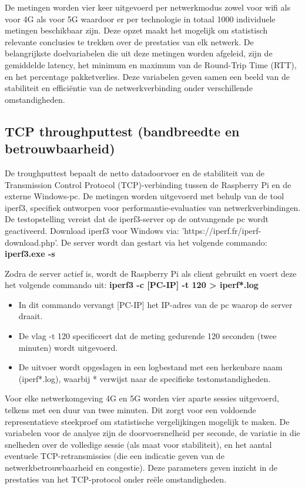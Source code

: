 De metingen worden vier keer uitgevoerd per netwerkmodus zowel voor wifi als voor 4G als voor 5G waardoor er per technologie in totaal 1000 individuele metingen beschikbaar zijn. Deze opzet maakt het mogelijk om statistisch relevante conclusies te trekken over de prestaties van elk netwerk.
De belangrijkste doelvariabelen die uit deze metingen worden afgeleid, zijn de gemiddelde latency, het minimum en maximum van de Round-Trip Time (RTT), en het percentage pakketverlies. Deze variabelen geven samen een beeld van de stabiliteit en efficiëntie van de netwerkverbinding onder verschillende omstandigheden.


\subsection{TCP throughputtest (bandbreedte en betrouwbaarheid)}
De troughputtest bepaalt de netto datadoorvoer en de stabiliteit van de Transmission Control Protocol (TCP)-verbinding tussen de Raspberry Pi en de externe Windows-pc. De metingen worden uitgevoerd met behulp van de tool iperf3, specifiek ontworpen voor performantie-evaluaties van netwerkverbindingen. 
De testopstelling vereist dat de iperf3-server op de ontvangende pc wordt geactiveerd. Download iperf3 voor Windows via: ’https://iperf.fr/iperf-download.php’.
De server wordt dan gestart via het volgende commando: \textbf{iperf3.exe -s} 

Zodra de server actief is, wordt de Raspberry Pi als client gebruikt en voert deze het volgende commando uit: \textbf{iperf3 -c [PC-IP] -t 120 > iperf*.log}

\begin{itemize}
    \item In dit commando vervangt [PC-IP] het IP-adres van de pc waarop de server draait.
    \item De vlag -t 120 specificeert dat de meting gedurende 120 seconden (twee minuten) wordt uitgevoerd. 
    \item De uitvoer wordt opgeslagen in een logbestand met een herkenbare naam (iperf*.log), waarbij * verwijst naar de specifieke testomstandigheden.
\end{itemize}


Voor elke netwerkomgeving 4G en 5G worden vier aparte sessies uitgevoerd, telkens met een duur van twee minuten. Dit zorgt voor een voldoende representatieve steekproef om statistische vergelijkingen mogelijk te maken. 
De variabelen voor de analyse zijn de doorvoersnelheid per seconde, de variatie in die snelheden over de volledige sessie (als maat voor stabiliteit), en het aantal eventuele TCP-retransmissies (die een indicatie geven van de  netwerkbetrouwbaarheid en congestie). Deze parameters geven inzicht in de prestaties van het TCP-protocol onder reële omstandigheden.


